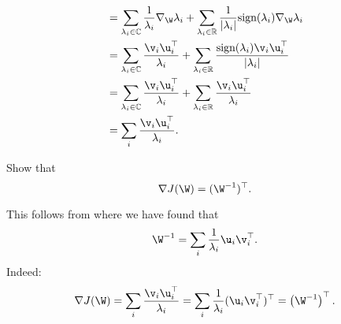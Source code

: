 \begin{exenumerate}
\begin{solution}
\begin{align}
                     &= \sum_{\lambda_i \in \mathbb{C}} \frac{1}{\lambda_i} \nabla_{\W} \lambda_i + 
                       \sum_{\lambda_i \in \mathbb{R}} \frac{1}{|\lambda_i|} \textrm{sign}(\lambda_i)\nabla_{\W}\lambda_i\\
                     &= \sum_{\lambda_i \in \mathbb{C}} \frac{\v_i\u_i^\top}{\lambda_i} + 
                       \sum_{\lambda_i \in \mathbb{R}} \frac{\textrm{sign}(\lambda_i)\v_i\u_i^\top}{|\lambda_i|} \\
                     &= \sum_{\lambda_i \in \mathbb{C}} \frac{\v_i\u_i^\top}{\lambda_i} + 
                       \sum_{\lambda_i \in \mathbb{R}} \frac{\v_i\u_i^\top}{\lambda_i} \\
                     &= \sum_i  \frac{\v_i\u_i^\top}{\lambda_i}.
      \end{align}
      
    \end{solution}
  \item Show that
    \begin{equation}
      \nabla J(\W) = (\W^{-1})^\top.
    \end{equation}
    
    \begin{solution}
    This follows from  where we have found
    that
    \begin{equation}
      \W^{-1}= \sum_i \frac{1}{\lambda_i}\u_i \v_i^\top.
    \end{equation}
    Indeed:
    \begin{align}
      \nabla J(\W) = \sum_i  \frac{\v_i\u_i^\top}{\lambda_i} = \sum_i \frac{1}{\lambda_i} (\u_i\v_i^\top)^\top =  \left(\W^{-1}\right)^\top.
    \end{align}
    
  \end{solution}
\end{exenumerate}


